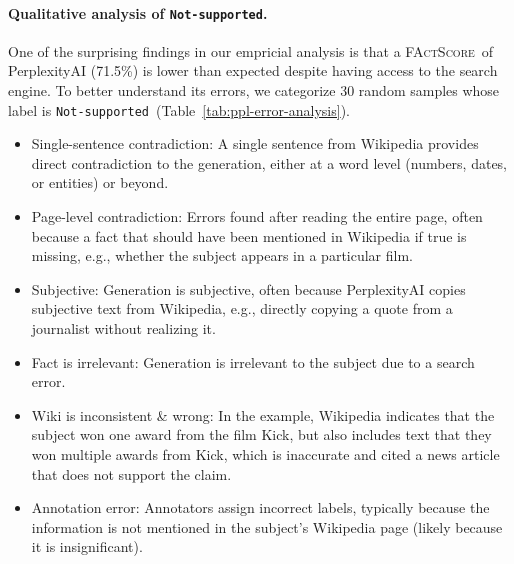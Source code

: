 \documentclass[11pt]{article}
\newcommand{\ours}{\textsc{FActScore}}
\newcommand{\nsLabel}{\texttt{Not-supported}}
\begin{document}
\vspace{-.3em}
\paragraph{Qualitative analysis of \nsLabel.}
One of the surprising findings in our empricial analysis is that a \ours\ of PerplexityAI (71.5\%) is lower than expected despite having access to the search engine. To better understand its errors, we categorize 30 random samples whose label is \nsLabel\ (Table~\ref{tab:ppl-error-analysis}).
\vspace{-.3em}
\begin{itemize}[leftmargin=12pt]\itemsep -.2em
    \item Single-sentence contradiction: A single sentence from Wikipedia provides direct contradiction to the generation, either at a word level (numbers, dates, or entities) or beyond. %
    \item Page-level contradiction: Errors found after reading the entire page, often because a fact that should have been mentioned in Wikipedia if true is missing, e.g., whether the subject appears in a particular film.
    \item Subjective: Generation is subjective, often because PerplexityAI copies subjective text from Wikipedia, e.g., directly copying a quote from a journalist without realizing it.
    \item Fact is irrelevant: Generation is irrelevant to the subject due to a search error.
    \item Wiki is inconsistent \& wrong: In the example, Wikipedia indicates that the subject won one award from the film Kick, but also includes text that they won multiple awards from Kick, which is inaccurate and cited a news article that does not support the claim.
    \item Annotation error: Annotators assign incorrect labels, typically because the information is not mentioned in the subject's Wikipedia page (likely because it is insignificant). %
\end{itemize}
\end{document}
